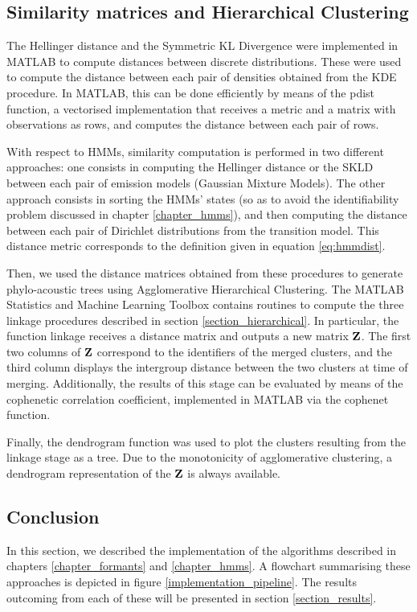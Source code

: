 \documentclass[../main.tex]{subfiles}
\begin{document}
\subsection{Similarity matrices and Hierarchical Clustering}
The Hellinger distance and the Symmetric KL Divergence were implemented in MATLAB to compute distances between discrete distributions. These were used to compute the distance between each pair of densities obtained from the KDE procedure. In MATLAB, this can be done efficiently by means of the pdist function, a vectorised implementation that receives a metric and a matrix with observations as rows, and computes the distance between each pair of rows.
\par With respect to HMMs, similarity computation is performed in two different approaches: one consists in computing the Hellinger distance or the SKLD between each pair of emission models (Gaussian Mixture Models). The other approach consists in sorting the HMMs' states (so as to avoid the identifiability problem discussed in chapter \ref{chapter_hmms}), and then computing the distance between each pair of Dirichlet distributions from the transition model. This distance metric corresponds to the definition given in equation \ref{eq:hmmdist}.
\par Then, we used the distance matrices obtained from these procedures to generate phylo-acoustic trees using Agglomerative Hierarchical Clustering. The MATLAB Statistics and Machine Learning Toolbox contains routines to compute the three linkage procedures described in section \ref{section_hierarchical}. In particular, the function linkage receives a distance matrix and outputs a new matrix $\mathbf{Z}$. The first two columns of $\mathbf{Z}$ correspond to the identifiers of the merged clusters, and the third column displays the intergroup distance between the two clusters at time of merging. Additionally, the results of this stage can be evaluated by means of the cophenetic correlation coefficient, implemented in MATLAB via the cophenet function.
\par Finally, the dendrogram function was used to plot the clusters resulting from the linkage stage as a tree. Due to the monotonicity of agglomerative clustering, a dendrogram representation of the $\mathbf{Z}$ is always available. 

\subsection{Conclusion} \label{section_5conclusion}
In this section, we described the implementation of the algorithms described in chapters  \ref{chapter_formants} and \ref{chapter_hmms}. A flowchart summarising these approaches is depicted in figure \ref{implementation_pipeline}. The results outcoming from each of these will be presented in section \ref{section_results}. 
\end{document}
